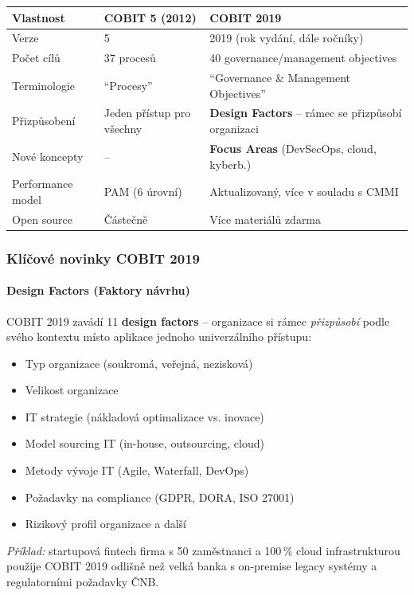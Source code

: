 \begin{center}
\begin{tabular}{p{4cm}p{4.5cm}p{4.5cm}}
\toprule
\textbf{Vlastnost} & \textbf{COBIT 5 (2012)} & \textbf{COBIT 2019} \\
\midrule
Verze & 5 & 2019 (rok vydání, dále ročníky) \\
Počet cílů & 37 procesů & 40 governance/management objectives \\
Terminologie & ``Procesy'' & ``Governance \& Management Objectives'' \\
Přizpůsobení & Jeden přístup pro všechny & \textbf{Design Factors} -- rámec se přizpůsobí organizaci \\
Nové koncepty & -- & \textbf{Focus Areas} (DevSecOps, cloud, kyberb.) \\
Performance model & PAM (6 úrovní) & Aktualizovaný, více v souladu s CMMI \\
Open source & Částečně & Více materiálů zdarma \\
\bottomrule
\end{tabular}
\end{center}

\subsubsection{Klíčové novinky COBIT 2019}

\paragraph{Design Factors (Faktory návrhu)}
COBIT 2019 zavádí 11 \textbf{design factors} -- organizace si rámec \textit{přizpůsobí} podle svého
kontextu místo aplikace jednoho univerzálního přístupu:
\begin{itemize}
  \item Typ organizace (soukromá, veřejná, nezisková)
  \item Velikost organizace
  \item IT strategie (nákladová optimalizace vs. inovace)
  \item Model sourcing IT (in-house, outsourcing, cloud)
  \item Metody vývoje IT (Agile, Waterfall, DevOps)
  \item Požadavky na compliance (GDPR, DORA, ISO 27001)
  \item Rizikový profil organizace a další
\end{itemize}

\textit{Příklad:} startupová fintech firma s 50 zaměstnanci a 100\,\% cloud infrastrukturou
použije COBIT 2019 odlišně než velká banka s on-premise legacy systémy a regulatorními požadavky ČNB.

